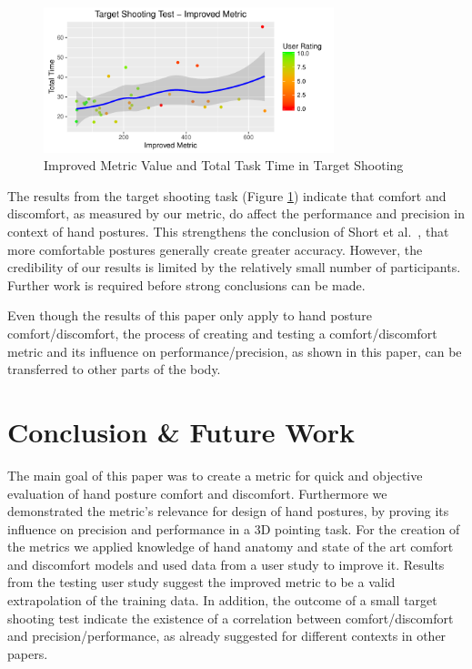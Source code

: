 \documentclass{sig-alternate-05-2015}
\begin{document}
\begin{figure}[h]
\centering
\includegraphics[width=8.45cm]{TargetShooting}
\vspace{-20pt}
\caption{Improved Metric Value and Total Task Time in Target Shooting}
\label{fig:targetShooting}
\vspace{-18pt}
\end{figure}

The results from the target shooting task (Figure \ref{fig:targetShooting}) indicate that comfort and discomfort, as measured by our metric, do affect the performance and precision in context of hand postures. This strengthens the conclusion of Short et al.~\cite{short1999precision}, that more comfortable postures generally create greater accuracy. However, the credibility of our results is limited by the relatively small number of participants. Further work is required before strong conclusions can be made.

Even though the results of this paper only apply to hand posture comfort/discomfort, the process of creating and testing a comfort/discomfort metric and its influence on performance/precision, as shown in this paper, can be transferred to other parts of the body. 

\section{Conclusion \& Future Work}
The main goal of this paper was to create a metric for quick and objective evaluation of hand posture comfort and discomfort. Furthermore we demonstrated the metric's relevance for design of hand postures, by proving its influence on precision and performance in a 3D pointing task. For the creation of the metrics we applied knowledge of hand anatomy and state of the art comfort and discomfort models and used data from a user study to improve it. Results from the testing user study suggest the improved metric to be a valid extrapolation of the training data. In addition, the outcome of a small target shooting test indicate the existence of a correlation between comfort/discomfort and precision/performance, as already suggested for different contexts in other papers.
\end{document}
